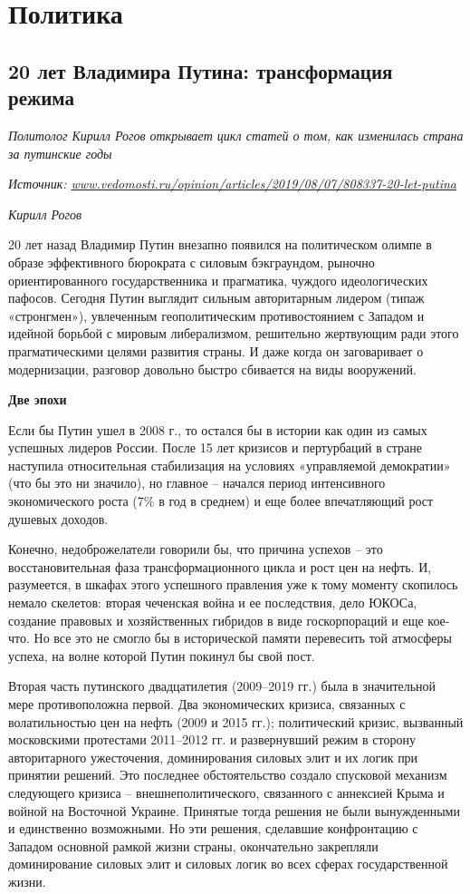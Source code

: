 \chapter{Политика}


\section{20 лет Владимира Путина: трансформация режима}

\textit{Политолог Кирилл Рогов открывает цикл статей о том, как изменилась страна за путинские годы}

\textit{Источник: \url{www.vedomosti.ru/opinion/articles/2019/08/07/808337-20-let-putina}}

\textit{Кирилл Рогов }

20 лет назад Владимир Путин внезапно появился на политическом олимпе в образе эффективного бюрократа с силовым бэкграундом, рыночно ориентированного государственника и прагматика, чуждого идеологических пафосов. Сегодня Путин выглядит сильным авторитарным лидером (типаж «стронгмен»), увлеченным геополитическим противостоянием с Западом и идейной борьбой с мировым либерализмом, решительно жертвующим ради этого прагматическими целями развития страны. И даже когда он заговаривает о модернизации, разговор довольно быстро сбивается на виды вооружений.

\textbf{Две эпохи}



Если бы Путин ушел в 2008 г., то остался бы в истории как один из самых успешных лидеров России. После 15 лет кризисов и пертурбаций в стране наступила относительная стабилизация на условиях «управляемой демократии» (что бы это ни значило), но главное – начался период интенсивного экономического роста (7\% в год в среднем) и еще более впечатляющий рост душевых доходов.

Конечно, недоброжелатели говорили бы, что причина успехов – это восстановительная фаза трансформационного цикла и рост цен на нефть. И, разумеется, в шкафах этого успешного правления уже к тому моменту скопилось немало скелетов: вторая чеченская война и ее последствия, дело ЮКОСа, создание правовых и хозяйственных гибридов в виде госкорпораций и еще кое-что. Но все это не смогло бы в исторической памяти перевесить той атмосферы успеха, на волне которой Путин покинул бы свой пост.

Вторая часть путинского двадцатилетия (2009–2019 гг.) была в значительной мере противоположна первой. Два экономических кризиса, связанных с волатильностью цен на нефть (2009 и 2015 гг.); политический кризис, вызванный московскими протестами 2011–2012 гг. и развернувший режим в сторону авторитарного ужесточения, доминирования силовых элит и их логик при принятии решений. Это последнее обстоятельство создало спусковой механизм следующего кризиса – внешнеполитического, связанного с аннексией Крыма и войной на Восточной Украине. Принятые тогда решения не были вынужденными и единственно возможными. Но эти решения, сделавшие конфронтацию с Западом основной рамкой жизни страны, окончательно закрепляли доминирование силовых элит и силовых логик во всех сферах государственной жизни.

